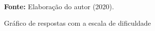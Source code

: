 \begin{figure}[ht!]
\centering

\caption{\textmd{Gráfico de respostas com a escala de dificuldade}}
\label{fig:dificuldadendevesp}

\par\medskip\textbf{Fonte:} Elaboração do autor (2020). \par\medskip

\end{figure}


